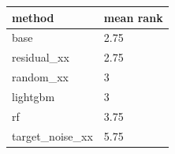 \begin{tabular}{ll}
\toprule
method & mean rank \\
\midrule
base & 2.75 \\
residual\_xx & 2.75 \\
random\_xx & 3 \\
lightgbm & 3 \\
rf & 3.75 \\
target\_noise\_xx & 5.75 \\
\bottomrule
\end{tabular}

